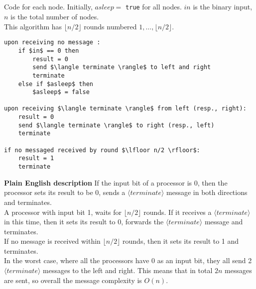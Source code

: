 \documentclass[11pt]{article}
\begin{document}
\subsection{}

Code for each node. Initially, $asleep =$ \texttt{true} for all nodes. $in$ is the binary input, $n$ is the total number of nodes.\\
This algorithm has $\lfloor n/2 \rfloor$ rounds numbered $1,\dots,\lfloor n/2 \rfloor$.

\begin{lstlisting}
upon receiving no message :
	if $in$ == 0 then
		result = 0
		send $\langle terminate \rangle$ to left and right
		terminate
	else if $asleep$ then
		$asleep$ = false

upon receiving $\langle terminate \rangle$ from left (resp., right):
	result = 0
	send $\langle terminate \rangle$ to right (resp., left)
	terminate
	
if no messaged received by round $\lfloor n/2 \rfloor$:
	result = 1
	terminate

\end{lstlisting}

\textbf{Plain English description}
If the input bit of a processor is 0, then the processor sets its result to be 0, sends a $\langle terminate \rangle$ message in both directions and terminates.\\
A processor with input bit 1, waits for  $\lfloor n/2 \rfloor$ rounds. If it receives a $\langle terminate \rangle$ in this time, then it sets its result to 0, forwards the $\langle terminate \rangle$ message and terminates.\\
If no message is received within $\lfloor n/2 \rfloor$ rounds, then it sets its result to 1 and terminates.\\

In the worst case, where all the processors have 0 as an input bit, they all send 2 $\langle terminate \rangle$ messages to the left and right. This means that in total $2n$ messages are sent, so overall the message complexity is $O(n)$.
\end{document}
